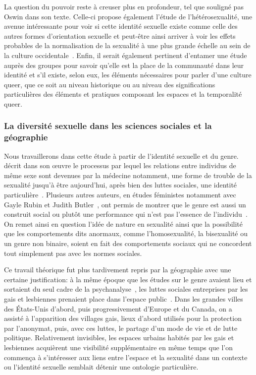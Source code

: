La question du pouvoir reste à creuser plus en profondeur, tel que souligné pas Oswin dans son texte. 
Celle-ci propose également l'étude de l'hétérosexualité, une avenue intéressante pour voir si cette identité sexuelle existe comme celle des autres formes d'orientation sexuelle et peut-être ainsi arriver à voir les effets probables de la normalisation de la sexualité à une plus grande échelle au sein de la culture occidentale~\citep[100]{Oswin2008}. 
Enfin, il serait également pertinent d’entamer une étude auprès des groupes \lgbt{} pour savoir qu'elle est la place de la communauté dans leur identité et s'il existe, selon eux, les éléments nécessaires pour parler d'une culture queer, que ce soit au niveau historique ou au niveau des significations particulières des éléments et pratiques composant les espaces et la temporalité queer.

\subsubsection{La diversité sexuelle dans les sciences sociales et la
géographie}
\label{ssub:la_diversit_sexuelle_dans_les_sciences_sociales_et_la_g_ographie}
Nous travaillerons dans cette étude à partir de l'identité sexuelle et du genre.
\citet{Foucault2011} décrit dans son œuvre  le processus par lequel les relations entre individus de même sexe sont devenues par la médecine notamment, une forme de trouble de la sexualité jusqu'à être aujourd'hui, après bien des luttes sociales, une identité particulière~\citep{Foucault2011}. 
Plusieurs autres auteurs, en études féministes notamment avec Gayle Rubin et Judith Butler~\citep[98]{Marcus2005}, ont permis de montrer que le genre est aussi un construit social ou plutôt une performance qui n'est pas l'essence de l'individu~\citep{Butler2007}. 
On remet ainsi en question l'idée de nature en sexualité ainsi que la possibilité que les comportements dits anormaux, comme l'homosexualité, la bisexualité ou un genre non binaire, soient en fait des comportements sociaux qui ne concordent tout simplement pas avec les normes sociales.

Ce travail théorique fut plus tardivement repris par la géographie avec une certaine justification: à la même époque que les études sur le genre avaient lieu et sortaient du seul cadre de la psychanalyse~\citep{Rubin2011a,Rubin2011}, les luttes sociales entreprises par les gais et lesbiennes prenaient place dans l'espace public~\citep[422-427]{Spencer2005}. 
Dans les grandes villes des États-Unis d'abord, puis progressivement d'Europe et du Canada, on a assisté à l'apparition des villages gais, lieux d'abord utilisés pour la protection par l'anonymat, puis, avec ces luttes, le partage d'un mode de vie et de lutte politique. 
Relativement invisibles, les espaces urbains habités par les gais et lesbiennes acquièrent une visibilité supplémentaire en même temps que l'on commença à s'intéresser aux liens entre l'espace et la sexualité dans un contexte ou l'identité sexuelle semblait détenir une ontologie particulière.

